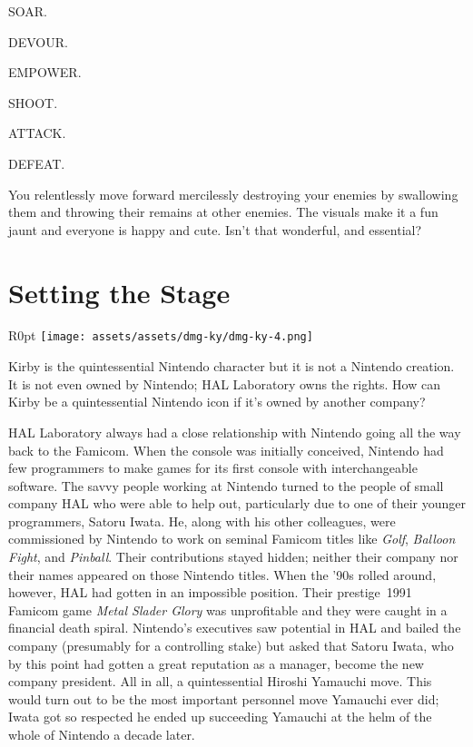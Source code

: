 \documentclass{book}
\begin{document}
SOAR.

DEVOUR.

EMPOWER.

SHOOT.

ATTACK.

DEFEAT.

You relentlessly move forward mercilessly destroying your enemies by swallowing them and throwing their remains at other enemies. The visuals make it a fun jaunt and everyone is happy and cute. Isn’t that wonderful, and essential?

\FloatBarrier\needspace{10mm}\section*{Setting the Stage}\nopagebreak[4]

\begin{wrapfigure}{R}{0pt} \texttt{[image: assets/assets/dmg-ky/dmg-ky-4.png]}\end{wrapfigure}
Kirby is the quintessential Nintendo character but it is not a Nintendo creation. It is not even owned by Nintendo; HAL Laboratory owns the rights. How can Kirby be a quintessential Nintendo icon if it’s owned by another company?

HAL Laboratory always had a close relationship with Nintendo going all the way back to the Famicom. When the console was initially conceived, Nintendo had few programmers to make games for its first console with interchangeable software. The savvy people working at Nintendo turned to the people of small company HAL who were able to help out, particularly due to one of their younger programmers, Satoru Iwata. He, along with his other colleagues, were commissioned by Nintendo to work on seminal Famicom titles like \emph{Golf}, \emph{Balloon Fight}, and \emph{Pinball}. Their contributions stayed hidden; neither their company nor their names appeared on those Nintendo titles. When the ’90s rolled around, however, HAL had gotten in an impossible position. Their prestige 1991 Famicom game \emph{Metal Slader Glory} was unprofitable and they were caught in a financial death spiral. Nintendo’s executives saw potential in HAL and bailed the company (presumably for a controlling stake) but asked that Satoru Iwata, who by this point had gotten a great reputation as a manager, become the new company president. All in all, a quintessential Hiroshi Yamauchi move. This would turn out to be the most important personnel move Yamauchi ever did; Iwata got so respected he ended up succeeding Yamauchi at the helm of the whole of Nintendo a decade later.
\end{document}
